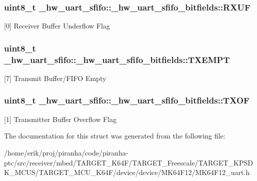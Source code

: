 \subsubsection[{\texorpdfstring{R\+X\+UF}{RXUF}}]{\setlength{\rightskip}{0pt plus 5cm}uint8\+\_\+t \+\_\+hw\+\_\+uart\+\_\+sfifo\+::\+\_\+hw\+\_\+uart\+\_\+sfifo\+\_\+bitfields\+::\+R\+X\+UF}\hypertarget{struct__hw__uart__sfifo_1_1__hw__uart__sfifo__bitfields_afba1ef0879b7f25dcf5b86b12ea4bf9e}{}\label{struct__hw__uart__sfifo_1_1__hw__uart__sfifo__bitfields_afba1ef0879b7f25dcf5b86b12ea4bf9e}
\mbox{[}0\mbox{]} Receiver Buffer Underflow Flag 
\subsubsection[{\texorpdfstring{T\+X\+E\+M\+PT}{TXEMPT}}]{\setlength{\rightskip}{0pt plus 5cm}uint8\+\_\+t \+\_\+hw\+\_\+uart\+\_\+sfifo\+::\+\_\+hw\+\_\+uart\+\_\+sfifo\+\_\+bitfields\+::\+T\+X\+E\+M\+PT}\hypertarget{struct__hw__uart__sfifo_1_1__hw__uart__sfifo__bitfields_ac4d4a97545a8e7e4364eef3d2908bfd9}{}\label{struct__hw__uart__sfifo_1_1__hw__uart__sfifo__bitfields_ac4d4a97545a8e7e4364eef3d2908bfd9}
\mbox{[}7\mbox{]} Transmit Buffer/\+F\+I\+FO Empty 
\subsubsection[{\texorpdfstring{T\+X\+OF}{TXOF}}]{\setlength{\rightskip}{0pt plus 5cm}uint8\+\_\+t \+\_\+hw\+\_\+uart\+\_\+sfifo\+::\+\_\+hw\+\_\+uart\+\_\+sfifo\+\_\+bitfields\+::\+T\+X\+OF}\hypertarget{struct__hw__uart__sfifo_1_1__hw__uart__sfifo__bitfields_aeebdcea7a2eb247d26344db041c63906}{}\label{struct__hw__uart__sfifo_1_1__hw__uart__sfifo__bitfields_aeebdcea7a2eb247d26344db041c63906}
\mbox{[}1\mbox{]} Transmitter Buffer Overflow Flag 

The documentation for this struct was generated from the following file\+:\begin{DoxyCompactItemize}
\item 
/home/erik/proj/piranha/code/piranha-\/ptc/src/receiver/mbed/\+T\+A\+R\+G\+E\+T\+\_\+\+K64\+F/\+T\+A\+R\+G\+E\+T\+\_\+\+Freescale/\+T\+A\+R\+G\+E\+T\+\_\+\+K\+P\+S\+D\+K\+\_\+\+M\+C\+U\+S/\+T\+A\+R\+G\+E\+T\+\_\+\+M\+C\+U\+\_\+\+K64\+F/device/device/\+M\+K64\+F12/M\+K64\+F12\+\_\+uart.\+h\end{DoxyCompactItemize}
